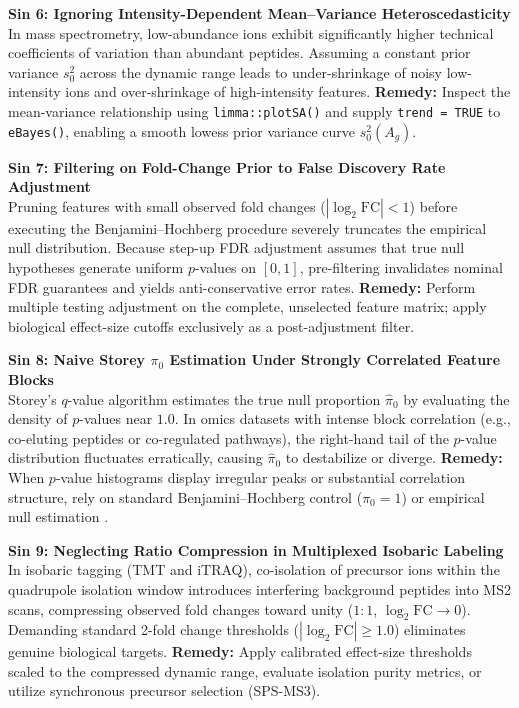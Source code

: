 \documentclass[11pt,twoside,openright]{book}
\begin{document}
\begin{pitfallbox}
\textbf{Sin 6: Ignoring Intensity-Dependent Mean--Variance Heteroscedasticity}\\
In mass spectrometry, low-abundance ions exhibit significantly higher technical coefficients of variation than abundant peptides. Assuming a constant prior variance $s_0^2$ across the dynamic range leads to under-shrinkage of noisy low-intensity ions and over-shrinkage of high-intensity features. \textbf{Remedy:} Inspect the mean-variance relationship using \texttt{limma::plotSA()} and supply \texttt{trend = TRUE} to \texttt{eBayes()}, enabling a smooth lowess prior variance curve $s_0^2(A_g)$.
\end{pitfallbox}

\begin{pitfallbox}
\textbf{Sin 7: Filtering on Fold-Change Prior to False Discovery Rate Adjustment}\\
Pruning features with small observed fold changes ($|\log_2 \text{FC}| < 1$) before executing the Benjamini--Hochberg procedure severely truncates the empirical null distribution. Because step-up FDR adjustment assumes that true null hypotheses generate uniform $p$-values on $[0, 1]$, pre-filtering invalidates nominal FDR guarantees and yields anti-conservative error rates. \textbf{Remedy:} Perform multiple testing adjustment on the complete, unselected feature matrix; apply biological effect-size cutoffs exclusively as a post-adjustment filter.
\end{pitfallbox}

\begin{pitfallbox}
\textbf{Sin 8: Naive Storey $\pi_0$ Estimation Under Strongly Correlated Feature Blocks}\\
Storey's $q$-value algorithm estimates the true null proportion $\hat{\pi}_0$ by evaluating the density of $p$-values near $1.0$. In omics datasets with intense block correlation (e.g., co-eluting peptides or co-regulated pathways), the right-hand tail of the $p$-value distribution fluctuates erratically, causing $\hat{\pi}_0$ to destabilize or diverge. \textbf{Remedy:} When $p$-value histograms display irregular peaks or substantial correlation structure, rely on standard Benjamini--Hochberg control ($\pi_0 = 1$) or empirical null estimation \cite{efron2004large}.
\end{pitfallbox}

\begin{pitfallbox}
\textbf{Sin 9: Neglecting Ratio Compression in Multiplexed Isobaric Labeling}\\
In isobaric tagging (TMT and iTRAQ), co-isolation of precursor ions within the quadrupole isolation window introduces interfering background peptides into MS2 scans, compressing observed fold changes toward unity ($1:1$, $\log_2 \text{FC} \to 0$). Demanding standard 2-fold change thresholds ($|\log_2 \text{FC}| \ge 1.0$) eliminates genuine biological targets. \textbf{Remedy:} Apply calibrated effect-size thresholds scaled to the compressed dynamic range, evaluate isolation purity metrics, or utilize synchronous precursor selection (SPS-MS3).
\end{pitfallbox}
\end{document}

